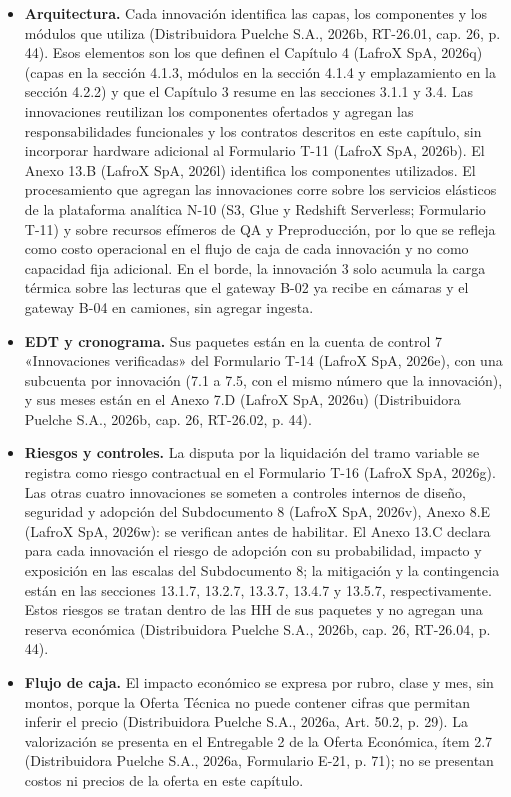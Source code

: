 \begin{itemize}
  \item \textbf{Arquitectura.} Cada innovación identifica las capas, los componentes y los módulos que utiliza (Distribuidora Puelche S.A., 2026b, RT-26.01, cap. 26, p. 44). Esos elementos son los que definen el Capítulo 4 (LafroX SpA, 2026q) (capas en la sección 4.1.3, módulos en la sección 4.1.4 y emplazamiento en la sección 4.2.2) y que el Capítulo 3 resume en las secciones 3.1.1 y 3.4. Las innovaciones reutilizan los componentes ofertados y agregan las responsabilidades funcionales y los contratos descritos en este capítulo, sin incorporar hardware adicional al Formulario T-11 (LafroX SpA, 2026b). El Anexo 13.B (LafroX SpA, 2026l) identifica los componentes utilizados. El procesamiento que agregan las innovaciones corre sobre los servicios elásticos de la plataforma analítica N-10 (S3, Glue y Redshift Serverless; Formulario T-11) y sobre recursos efímeros de QA y Preproducción, por lo que se refleja como costo operacional en el flujo de caja de cada innovación y no como capacidad fija adicional. En el borde, la innovación 3 solo acumula la carga térmica sobre las lecturas que el gateway B-02 ya recibe en cámaras y el gateway B-04 en camiones, sin agregar ingesta.
  \item \textbf{EDT y cronograma.} Sus paquetes están en la cuenta de control 7 «Innovaciones verificadas» del Formulario T-14 (LafroX SpA, 2026e), con una subcuenta por innovación (7.1 a 7.5, con el mismo número que la innovación), y sus meses están en el Anexo 7.D (LafroX SpA, 2026u) (Distribuidora Puelche S.A., 2026b, cap. 26, RT-26.02, p. 44).
  \item \textbf{Riesgos y controles.} La disputa por la liquidación del tramo variable se registra como riesgo contractual en el Formulario T-16 (LafroX SpA, 2026g). Las otras cuatro innovaciones se someten a controles internos de diseño, seguridad y adopción del Subdocumento 8 (LafroX SpA, 2026v), Anexo 8.E (LafroX SpA, 2026w): se verifican antes de habilitar. El Anexo 13.C declara para cada innovación el riesgo de adopción con su probabilidad, impacto y exposición en las escalas del Subdocumento 8; la mitigación y la contingencia están en las secciones 13.1.7, 13.2.7, 13.3.7, 13.4.7 y 13.5.7, respectivamente. Estos riesgos se tratan dentro de las HH de sus paquetes y no agregan una reserva económica (Distribuidora Puelche S.A., 2026b, cap. 26, RT-26.04, p. 44).
  \item \textbf{Flujo de caja.} El impacto económico se expresa por rubro, clase y mes, sin montos, porque la Oferta Técnica no puede contener cifras que permitan inferir el precio (Distribuidora Puelche S.A., 2026a, Art. 50.2, p. 29). La valorización se presenta en el Entregable 2 de la Oferta Económica, ítem 2.7 (Distribuidora Puelche S.A., 2026a, Formulario E-21, p. 71); no se presentan costos ni precios de la oferta en este capítulo.

\end{itemize}
